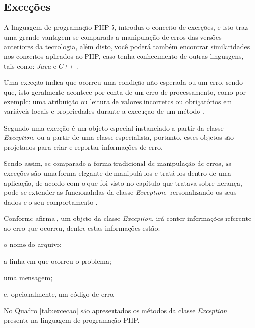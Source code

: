 \subsection{Exceções}

A linguagem de programação \acs{PHP} 5, introduz o conceito de exceções, e isto traz
uma grande vantagem se comparada a manipulação de erros das versões anteriores
da tecnologia, além disto, você poderá também encontrar similaridades nos
conceitos aplicados ao \acs{PHP}, caso tenha conhecimento de outras linguagens,
tais como: \textit{Java} e \textit{C++} \cite{phpObjectsPatternsAndPractice}.

Uma exceção indica que ocorreu uma condição não esperada ou um erro, sendo que,
isto geralmente acontece por conta de um erro de processamento, como por
exemplo: uma atribuição ou leitura de valores incorretos ou obrigatórios em
variáveis locais e propriedades durante a execuçao de um método \cite{learningJava}.

Segundo  uma exceção é um objeto
especial instanciado a partir da classe \textit{Exception}, ou a partir de uma
classe especialista, portanto, estes objetos são projetados para criar e
reportar informações de erro.

Sendo assim, se comparado a forma tradicional de manipulação de erros, as
exceções são uma forma elegante de manipulá-los e tratá-los dentro de uma
aplicação, de acordo com o que foi visto no capítulo que
tratava sobre herança, pode-se extender as funcionalidas da classe
\textit{Exception}, personalizando os seus dados e o seu comportamento \cite{phpMasterWriteCuttingEdgeCode}.

Conforme afirma , um objeto da classe
\textit{Exception}, irá conter informações referente ao erro que ocorreu, dentre
estas informações estão:

\begin{alineas}
    \item o nome do arquivo;
    \item a linha em que ocorreu o problema;
    \item uma mensagem;
    \item e, opcionalmente, um código de erro.
\end{alineas}

No Quadro \ref{tab:excecao} são apresentados os métodos da classe
\textit{Exception} presente na linguagem de programação \acs{PHP}.

